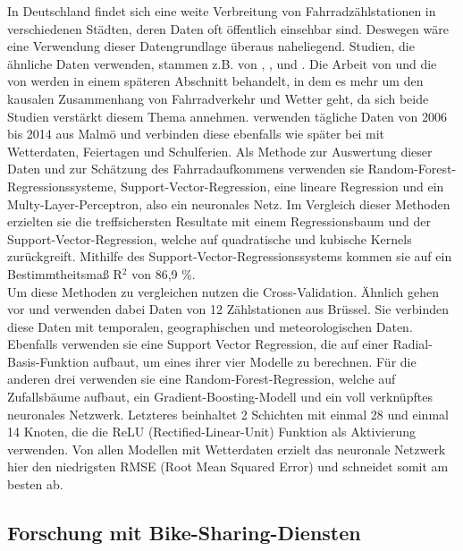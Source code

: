 \documentclass[a4paper,12pt]{thesis}
\begin{document}
In Deutschland findet sich eine weite Verbreitung von Fahrradzählstationen in verschiedenen Städten, deren Daten oft öffentlich einsehbar sind. Deswegen wäre eine Verwendung dieser Datengrundlage überaus naheliegend. Studien, die ähnliche Daten verwenden, stammen z.B. von \cite{Holmgren2017}, \cite{Broucke2019}, \cite{Wessel2020} und \cite{Goldmann2021}. Die Arbeit von \cite{Wessel2020} und die von \cite{Goldmann2021} werden in einem späteren Abschnitt behandelt, in dem es mehr um den kausalen Zusammenhang von Fahrradverkehr und Wetter geht, da sich beide Studien verstärkt diesem Thema annehmen. \cite{Holmgren2017} verwenden tägliche Daten von 2006 bis 2014 aus Malmö und verbinden diese ebenfalls wie später bei \cite{Wessel2020} mit Wetterdaten, Feiertagen und Schulferien. Als Methode zur Auswertung dieser Daten und zur Schätzung des Fahrradaufkommens verwenden sie Random-Forest-Regressionssysteme, Support-Vector-Regression, eine lineare Regression und ein Multy-Layer-Perceptron, also ein neuronales Netz. Im Vergleich dieser Methoden erzielten sie die treffsichersten Resultate mit einem Regressionsbaum und der Support-Vector-Regression, welche auf quadratische und kubische Kernels zurückgreift. Mithilfe des Support-Vector-Regressionssystems kommen sie auf ein Bestimmtheitsmaß R$^2$ von 86,9 \%.\\
Um diese Methoden zu vergleichen nutzen \cite{Holmgren2017} die Cross-Validation. Ähnlich gehen \cite{Broucke2019} vor und verwenden dabei Daten von 12 Zählstationen aus Brüssel. Sie verbinden diese Daten mit temporalen, geographischen und meteorologischen Daten. Ebenfalls verwenden sie eine Support Vector Regression, die auf einer Radial-Basis-Funktion aufbaut, um eines ihrer vier Modelle zu berechnen. Für die anderen drei verwenden sie eine Random-Forest-Regression, welche auf Zufallsbäume aufbaut, ein Gradient-Boosting-Modell und ein voll verknüpftes neuronales Netzwerk. Letzteres beinhaltet 2 Schichten mit einmal 28 und einmal 14 Knoten, die die ReLU (Rectified-Linear-Unit) Funktion als Aktivierung verwenden. Von allen Modellen mit Wetterdaten erzielt das neuronale Netzwerk hier den niedrigsten RMSE (Root Mean Squared Error) und schneidet somit am besten ab.

\subsection{Forschung mit Bike-Sharing-Diensten}
\end{document}
